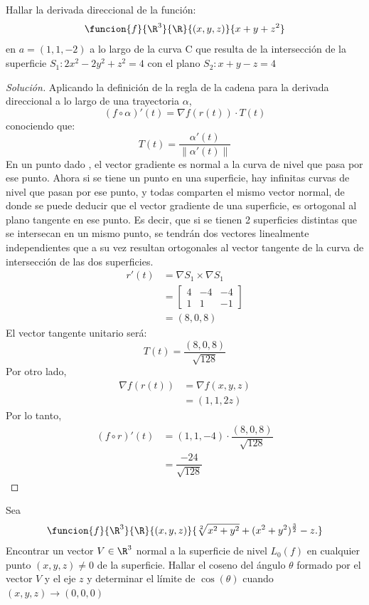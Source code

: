 \documentclass[a4,11pt]{aleph-notas}
\begin{document}
\begin{ejer}
Hallar la derivada direccional de la función:
	\[
        \funcion{f}{\R^3}{\R}{(x,y,z)}
        {x+y+z^2}
    \]
en $a=(1,1,-2)$ a lo largo de la curva C que resulta de la intersección de la superficie $S_1:2x^2-2y^2+z^2=4$ con el plano $S_2:x+y-z=4$
\end{ejer}

\begin{proof}[Solución]
Aplicando la definición de la regla de la cadena para la derivada direccional a lo largo de una trayectoria $\alpha$,
	\[
        (f\circ \alpha)'(t)=\nabla f(r(t)) \cdot T(t)
    \]
conociendo que:
	\[
        T(t)=\dfrac{\alpha'(t)}{\|\alpha'(t)\|}
    \]
En un punto dado , el vector gradiente es normal a la curva de nivel que pasa por ese punto. Ahora si se tiene un punto en una superficie, hay infinitas curvas de nivel que pasan por ese punto, y todas comparten el mismo vector normal, de donde se puede deducir que el vector gradiente de una superficie, es ortogonal al plano tangente en ese punto. Es decir, que si se tienen 2 superficies distintas que se intersecan en un mismo punto, se tendrán dos vectores linealmente independientes que a su vez resultan ortogonales al vector tangente de la curva de intersección de las dos superficies. 
	\[
    \begin{aligned}
        r'(t) & = \nabla S_1 \times \nabla S_1\\
        & = \begin{bmatrix}
    	4 & -4 & -4\\
   		1 & 1 & -1
		\end{bmatrix}\\
        & = (8,0,8)
    \end{aligned}
    \]
El vector tangente unitario será:
	\[
        T(t)=\dfrac{(8,0,8)}{\sqrt{128}}
    \]
Por otro lado,
	\[
    \begin{aligned}
	\nabla f(r(t)) & = \nabla f(x,y,z)\\
    & = (1,1,2z)
    \end{aligned}
    \]
Por lo tanto,
	\[
    \begin{aligned}
        (f\circ r)'(t) & = (1,1,-4) \cdot \dfrac{(8,0,8)}{\sqrt{128}}\\
        & = \dfrac{-24}{\sqrt{128}}
        \end{aligned}
    \]
\end{proof}

\begin{ejer}
Sea 
    \[
        \funcion{f}{\R^3}{\R}{(x,y,z)}
        {\sqrt[2]{x^2+y^2}+(x^2+y^2)^\frac{3}{2}-z.}
    \]
    Encontrar un vector $V \in \R^3$ normal a la superficie de nivel $L_0(f)$ en cualquier punto $(x,y,z) \neq 0$ de la superficie. Hallar el coseno del ángulo $\theta$ formado por el vector $V$ y el eje $z$ y determinar el límite de $\cos(\theta)$ cuando $(x,y,z) \to (0,0,0)$
\end{ejer}
\end{document}
